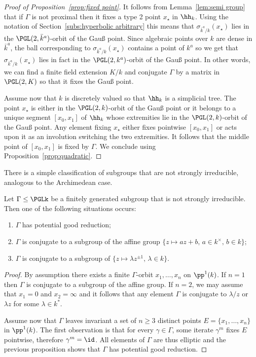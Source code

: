 \begin{proof}[Proof of Proposition~\ref{prop:fixed point}]
It follows from Lemma~\ref{lem:semi group} that if $\Gamma$ is not proximal then it fixes a type 2 point $x_\star$ in $\hh_k$. Using the notation of Section~\ref{subs:hyperbolic arbitrary} this means that $\sigma_{\bar{k}^a/k}(x_\star)$ lies in the $\PGL(2,\bar{k}^a)$-orbit of the Gau\ss{} point. Since algebraic points over $k$ are dense in $\bar{k}^a$, the ball corresponding to $\sigma_{\bar{k}^a/k}(x_\star)$ contains a point of $k^a$ so we get that $\sigma_{\bar{k}^a/k}(x_\star)$ lies in fact in the $\PGL(2,k^a)$-orbit of the Gau\ss{} point. In other words, we can find a finite field extension $K/k$ and conjugate $\Gamma$ by a matrix in $\PGL(2,K)$ so that it fixes the Gau\ss{} point.

Assume now that $k$ is discretely valued so that $\hh_k$ is a simplicial tree. The point $x_\star$ is either in the $\PGL(2,k)$-orbit of the Gau\ss{} point or it belongs to a unique segment $[x_0,x_1]$ of $\hh_k$ whose extremities lie in the $\PGL(2,k)$-orbit of the Gau\ss{} point. Any element fixing $x_\star$ either fixes pointwise $[x_0,x_1]$ or acts upon it as an involution switching the two extremities. It follows that the middle point of $[x_0,x_1]$ is fixed by $\Gamma$. We conclude using Proposition~\ref{prop:quadratic}.
\end{proof}


There is a simple classification of subgroups that are not strongly irreducible, analogous to the Archimedean case.

\begin{prop}\label{prop:strongly irreducible}
Let $\Gamma\leq \PGLk$ be a finitely generated subgroup that is not strongly irreducible. Then one of the following situations occurs:
\begin{enumerate}
\item $\Gamma$ has potential good reduction;
\item $\Gamma$ is conjugate to a subgroup of the affine group $\{z\mapsto a z + b, \, a \in k^\times, \, b\in k\}$;
\item $\Gamma$ is conjugate to a subgroup of $\{z\mapsto \lambda z^{\pm 1},\, \lambda \in k\}$.
\end{enumerate}
\end{prop}

\begin{proof}
By assumption there exists a finite $\Gamma$-orbit $x_1, \ldots, x_n$ on $\pp^1(k)$. If $n=1$ then $\Gamma$ is conjugate to a subgroup of the affine group. If $n=2$, we may assume that $x_1 =0$ and $x_2 =\infty$ and it follows that any element $\Gamma$ is conjugate to $\lambda /z$ or $\lambda z$ for some $\lambda\in k^*$.

Assume now that $\Gamma$ leaves invariant a set of $n\ge3$ distinct points $E= \{ x_1, \ldots, x_n \}$ in $\pp^1(k)$. The first observation is that for every $\gamma\in \Gamma$, some iterate $\gamma^m$ fixes $E$ pointwise, therefore $\gamma^m = \id$. All elements of $\Gamma$ are thus elliptic and the previous proposition shows that $\Gamma$ has potential good reduction.
\end{proof}

